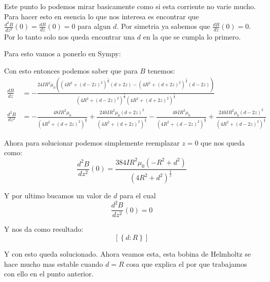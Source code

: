 \documentclass{report}
\begin{document}
\section{}

Este punto lo podemos mirar basicamente como si esta corriente no varie mucho. Para hacer esto en esencia lo
que nos interesa es encontrar que $\frac{d^2B}{dz^2}(0) = \frac{dB}{dz}(0) = 0$ para algun $d$. Por simetria ya sabemos
que $\frac{dB}{dz}(0) = 0$. Por lo tanto solo nos queda encontrar una $d$ en la que se cumpla lo primero.

Para esto vamos a ponerlo en Sympy:


Con esto entonces podemos saber que para $B$ tenemos:
\begin{align*}
	\frac{dB}{d z}&= - \frac{24 I R^{2} \mu_{0} \left(\left(4 R^{2} + \left(d - 2 z\right)^{2}\right)^{\frac{5}{2}} \left(d + 2 z\right) - \left(4 R^{2} + \left(d + 2 z\right)^{2}\right)^{\frac{5}{2}} \left(d - 2 z\right)\right)}{\left(4 R^{2} + \left(d - 2 z\right)^{2}\right)^{\frac{5}{2}} \left(4 R^{2} + \left(d + 2 z\right)^{2}\right)^{\frac{5}{2}}}\\
	\frac{d^2 B}{d z^2} &= - \frac{48 I R^{2} \mu_{0}}{\left(4 R^{2} + \left(d + 2 z\right)^{2}\right)^{\frac{5}{2}}} + \frac{240 I R^{2} \mu_{0} \left(d + 2 z\right)^{2}}{\left(4 R^{2} + \left(d + 2 z\right)^{2}\right)^{\frac{7}{2}}} - \frac{48 I R^{2} \mu_{0}}{\left(4 R^{2} + \left(d - 2 z\right)^{2}\right)^{\frac{5}{2}}} + \frac{240 I R^{2} \mu_{0} \left(d - 2 z\right)^{2}}{\left(4 R^{2} + \left(d - 2 z\right)^{2}\right)^{\frac{7}{2}}}
\end{align*}

Ahora para solucionar podemos simplemente reemplazar $z = 0$ que nos queda como:
\[
	\frac{d^2B}{dz^2}(0) = \frac{384 I R^{2} \mu_{0} \left(- R^{2} + d^{2}\right)}{\left(4 R^{2} + d^{2}\right)^{\frac{7}{2}}}
\]

Y por ultimo bucamos un valor de $d$ para el cual
\[
	\frac{d^2B}{dz^2}(0) = 0
\]

Y nos da como resultado:
\[
	\left[ \left\{ d : R\right\}\right]
\]

Y con esto queda solucionado. Ahora veamos esta, esta bobina de Helmholtz se hace mucho mas estable cuando $d = R$ cosa que explica el por que trabajamos con ello en el punto anterior.

\section{}
\end{document}
